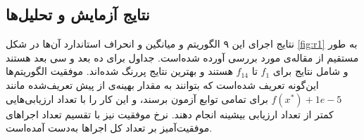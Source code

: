 \documentclass[12pt,a4paper]{article}
\theoremstyle{definition}
\theoremstyle{theorem}
\theoremstyle{definition}
\begin{document}
\subsection{نتایج آزمایش و تحلیل‌ها}

نتایج اجرای این ۹ الگوریتم و میانگین و انحراف استاندارد آن‌ها در شکل‌ \ref{fig:r1} به طور مستقیم از مقاله‌ی مورد بررسی آورده شده‌است. جداول برای ده بعد و سی بعد هستند و شامل نتایج برای 
$f_1$
تا 
$f_{14}$
هستند و بهترین نتایج پررنگ شده‌اند. موفقیت الگوریتم‌ها این‌گونه تعریف شده‌است که بتوانند به مقدار بهینه‌ی از پیش تعریف‌شده مانند 
$f(x^*)+1 e -5$
برای تمامی توابع آزمون برسند، و این کار را با تعداد ارزیابی‌هایی کمتر از تعداد ارزیابی بیشینه انجام دهند. نرخ موفقیت نیز با تقسیم تعداد اجراهای موفقیت‌آمیز بر تعداد کل اجراها به‌دست آمده‌است. 

\begin{figure}
\noindent{}
\end{figure}
\end{document}
